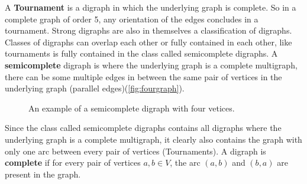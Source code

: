 A \textbf{Tournament} is a digraph in which the underlying graph is complete. 
So in a complete graph of order 5, any orientation of the edges concludes in a tournament.
Strong digraphs are also in themselves a classification of digraphs. 
Classes of digraphs can overlap each other or fully contained in each other, like tournaments is fully contained in the class called semicomplete digraphs.
A \textbf{semicomplete} digraph is where the underlying graph is a complete multigraph, there can be some multiple edges in between the same pair of vertices in the underlying graph (parallel edges)(\autoref{fig:fourgraph}). 
\begin{figure}[htp]
    \begin{subfigure}[b]{1\textwidth}
        \centering
    \end{subfigure}
    \caption{An example of a semicomplete digraph with four vetices.}
    \label{fig:fourgraph}
\end{figure}
Since the class called semicomplete digraphs contains all digraphs where the underlying graph is a complete multigraph, it clearly also contains the graph with only one arc between every pair of vertices (Tournaments).
A digraph is \textbf{complete} if for every pair of vertices $a,b\in V$, the arc $(a,b)$ and $(b,a)$ are present in the graph. \\
